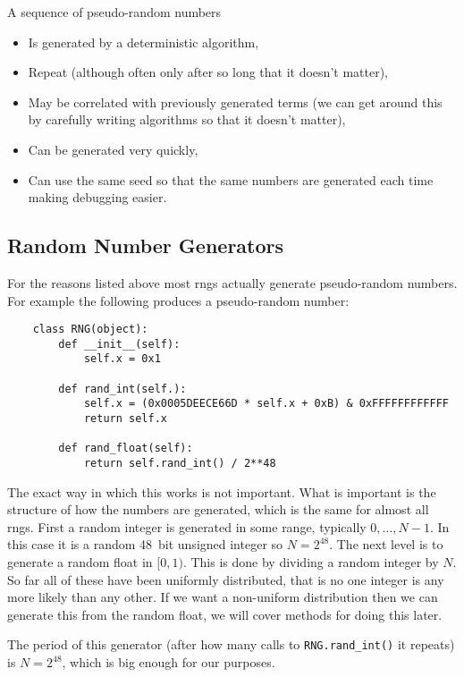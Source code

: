 \documentclass[a4paper]{article}
\begin{document}
    A sequence of pseudo-random numbers
    \begin{itemize}
        \item Is generated by a deterministic algorithm,
        \item Repeat (although often only after so long that it doesn't matter),
        \item May be correlated with previously generated terms (we can get around this by carefully writing algorithms so that it doesn't matter),
        \item Can be generated very quickly,
        \item Can use the same seed so that the same numbers are generated each time making debugging easier.
    \end{itemize}

    \subsection{Random Number Generators}
    For the reasons listed above most \glspl{rng} actually generate pseudo-random numbers.
    For example the following produces a pseudo-random number:
    \begin{lstlisting}
    class RNG(object):
        def __init__(self):
            self.x = 0x1
        
        def rand_int(self.):
            self.x = (0x0005DEECE66D * self.x + 0xB) & 0xFFFFFFFFFFFF
            return self.x
        
        def rand_float(self):
            return self.rand_int() / 2**48
    \end{lstlisting}
    The exact way in which this works is not important.
    What is important is the structure of how the numbers are generated, which is the same for almost all \glspl{rng}.
    First a random integer is generated in some range, typically \(0, \dotsc, N-1\).
    In this case it is a random \SI{48}{bit} unsigned integer so \(N = 2^{48}\).
    The next level is to generate a random float in \([0, 1)\).
    This is done by dividing a random integer by \(N\).
    So far all of these have been uniformly distributed, that is no one integer is any more likely than any other.
    If we want a non-uniform distribution then we can generate this from the random float, we will cover methods for doing this later.
    
    The period of this generator (after how many calls to \lstinline|RNG.rand_int()| it repeats) is \(N = 2^{48}\), which is big enough for our purposes.
    
\end{document}
